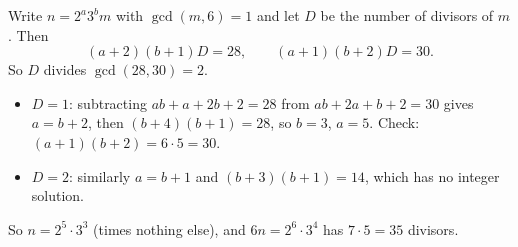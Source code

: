Write $n=2^a3^bm$ with $\gcd(m,6)=1$ and let $D$ be the number of divisors of $m$. Then
\[(a+2)(b+1)D=28,\qquad(a+1)(b+2)D=30.\]
So $D$ divides $\gcd(28,30)=2$.
\begin{itemize}
\item $D=1$: subtracting $ab+a+2b+2=28$ from $ab+2a+b+2=30$ gives $a=b+2$, then $(b+4)(b+1)=28$, so $b=3$, $a=5$. Check: $(a+1)(b+2)=6\cdot5=30$.
\item $D=2$: similarly $a=b+1$ and $(b+3)(b+1)=14$, which has no integer solution.
\end{itemize}
So $n=2^5\cdot3^3$ (times nothing else), and $6n=2^6\cdot3^4$ has $7\cdot5=\boxed{35}$ divisors.
